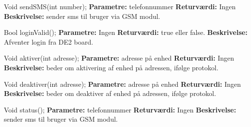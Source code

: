 
Void sendSMS(int number);
\textbf{Parametre:} telefonnummer 
\textbf{Returværdi:} Ingen
\textbf{Beskrivelse:} sender sms til bruger via GSM modul.


Bool loginValid();
\textbf{Parametre:} Ingen 
\textbf{Returværdi:} true eller false.
\textbf{Beskrivelse:} Afventer login fra DE2 board.

Void aktiver(int adresse);
\textbf{Parametre:} adresse på enhed 
\textbf{Returværdi:} Ingen
\textbf{Beskrivelse:} beder om aktivering af enhed på adressen, ifølge protokol.


Void deaktiver(int adresse);
\textbf{Parametre:} adresse på enhed
\textbf{Returværdi:} Ingen
\textbf{Beskrivelse:} beder om deaktiver af enhed på adressen, ifølge protokol.


Void status();
\textbf{Parametre:} telefonnummer 
\textbf{Returværdi:} Ingen
\textbf{Beskrivelse:} sender sms til bruger via GSM modul.











